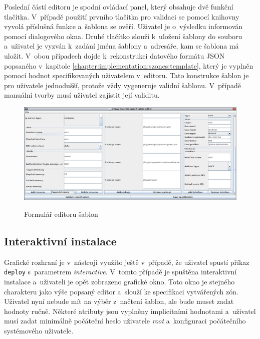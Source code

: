 Poslední částí editoru je spodní ovládací panel, který obsahuje dvě funkční tlačítka. V~případě použití prvního tlačítka
pro validaci se pomocí knihovny vyvolá příslušná funkce a~šablona se ověří. Uživatel je o~výsledku informován pomocí dialogového
okna. Druhé tlačítko slouží k~uložení šablony do souboru a~uživatel je vyzván k~zadání jména šablony a~adresáře, kam se šablona má uložit.
V~obou případech dojde k~rekonstrukci datového formátu JSON popsaného v~kapitole \ref{chapter:implementation:szones:template},
který je vyplněn pomocí hodnot specifikovaných uživatelem v~editoru. Tato konstrukce šablon je pro uživatele jednodušší, protože
vždy vygeneruje validní šablonu. V~případě manuální tvorby musí uživatel zajistit její validitu.
\begin{figure}
    \centering    
    \caption{Formulář editoru šablon}
    \includegraphics[scale=0.35]{assets/pdfs/implemetation_gui_form.png}
    \label{image:implemetation:gui:form}
\end{figure}
\subsection{Interaktivní instalace}
\label{chapter:implementation:gui:interactive}
Grafické rozhraní je v~nástroji využito ještě v~případě, že uživatel spustí příkaz \verb|deploy| s~parametrem \textit{interactive}.
V~tomto případě je spuštěna interaktivní instalace a~uživateli je opět zobrazeno grafické okno. Toto okno je stejného charakteru
jako výše popsaný editor a~slouží ke specifikaci vytvářených zón. Uživatel nyní nebude mít na výběr z~načtení šablon, ale bude muset
zadat hodnoty ručně. Některé atributy jsou vyplněny implicitními hodnotami a~uživatel musí zadat minimálně počáteční heslo 
uživatele \textit{root} a~konfiguraci počátečního systémového uživatele.